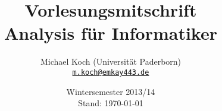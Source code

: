 \documentclass[a4paper]{scrreprt}
\begin{document}
\title{Vorlesungsmitschrift\\Analysis für Informatiker}
\author{Michael Koch (Universität Paderborn)\\\texttt{\href{mailto:m.koch@emkay443.de}{m.koch@emkay443.de}}}
\date{Wintersemester 2013/14\\Stand: \today}
\maketitle

\tableofcontents\newpage

%
\newpage %
\newpage
\newpage %
\newpage %
\newpage %
\newpage %
\newpage %
\newpage %
\newpage %
\newpage %
\newpage %
\newpage %
\newpage %
\newpage %
\newpage %
\newpage %
\newpage %
\newpage %
\newpage %
\newpage %
\newpage %
\newpage %
\newpage %
\newpage %
\newpage %
\newpage %
\newpage %
\newpage %
\newpage %
\newpage %
\newpage %
\newpage %
\newpage
\end{document}
